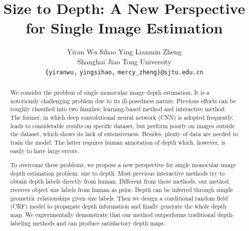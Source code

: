 \documentclass[10pt,twocolumn,letterpaper]{article}
\begin{document}
\title{Size to Depth: A New Perspective for Single Image Estimation}

\author{Yiran Wu \hspace{2cm} Sihao Ying \hspace{2cm} Lianmin Zheng\\
Shanghai Jiao Tong University\\
{\tt\small \{yiranwu,}
{\tt\small yingsihao,}
{\tt\small mercy\_zheng\}@sjtu.edu.cn}
}

\maketitle
\ifwacvfinal\thispagestyle{empty}\fi

\begin{abstract}
We consider the problem of single monocular image depth estimation. It is a notoriously challenging problem due to its ill-posedness nature. Previous efforts can be roughly classified into two families: learning-based method and interactive method. The former, in which deep convolutional neural network (CNN) is adopted frequently, leads to considerable results on specific dataset, but perform poorly on images outside the dataset, which shows its lack of extensiveness. Besides, plenty of data are needed to train the model. The latter requires human annotation of depth which, however, is easily to have large errors.

To overcome these problems, we propose a new perspective for single monocular image depth estimation problem: size to depth. Most previous interactive methods try to obtain depth labels directly from human. Different from these methods, our method receives object size labels from human as prior. Depth can be inferred through simple geometric relationships given size labels. Then we design a conditional random field (CRF) model to propagate depth information and finally generate the whole depth map. We experimentally demonstrate that our method outperforms traditional depth-labeling methods and can produce satisfactory depth maps.
\end{abstract}
\end{document}
